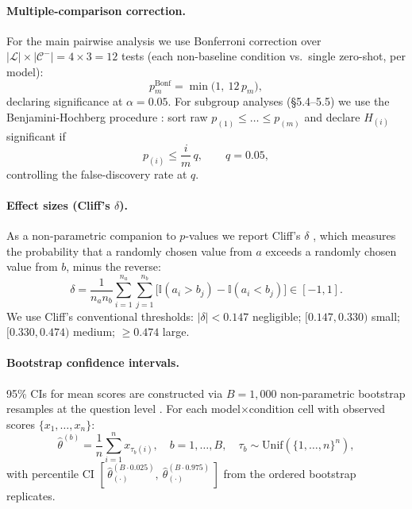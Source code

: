 \documentclass[final, 11pt, 3p]{elsarticle}
\begin{document}
\paragraph{Multiple-comparison correction.} For the main pairwise
analysis we use Bonferroni correction over $|\mathcal{L}| \times
|\mathcal{C}^{-}| = 4 \times 3 = 12$ tests (each non-baseline condition
vs.\ single zero-shot, per model):
\begin{equation}
p^{\mathrm{Bonf}}_m = \min\bigl(1,\ 12\, p_m\bigr),
\end{equation}
declaring significance at $\alpha = 0.05$. For subgroup analyses
(\S5.4--5.5) we use the Benjamini-Hochberg procedure
\cite{BenjaminiHochberg1995}: sort raw $p_{(1)} \leq \ldots \leq p_{(m)}$
and declare $H_{(i)}$ significant if
\begin{equation}
p_{(i)} \leq \frac{i}{m}\,q,\qquad q = 0.05,
\end{equation}
controlling the false-discovery rate at $q$.

\paragraph{Effect sizes (Cliff's $\delta$).} As a non-parametric
companion to $p$-values we report Cliff's $\delta$
\cite{Cliff1993}, which measures the probability that a randomly chosen
value from $a$ exceeds a randomly chosen value from $b$, minus the
reverse:
\begin{equation}
\delta = \frac{1}{n_a n_b}\sum_{i=1}^{n_a}\sum_{j=1}^{n_b}\bigl[\mathbb{I}(a_i > b_j) - \mathbb{I}(a_i < b_j)\bigr] \in [-1, 1].
\label{eq:cliff}
\end{equation}
We use Cliff's conventional thresholds: $|\delta| < 0.147$ negligible;
$[0.147, 0.330)$ small; $[0.330, 0.474)$ medium; $\geq 0.474$ large.

\paragraph{Bootstrap confidence intervals.} 95\% CIs for mean scores
are constructed via $B = 1{,}000$ non-parametric bootstrap resamples at
the question level \cite{EfronTibshirani1993}. For each model$\times$condition
cell with observed scores $\{x_1, \ldots, x_n\}$:
\begin{equation}
\hat{\theta}^{(b)} = \frac{1}{n}\sum_{i=1}^{n} x_{\tau_b(i)},\quad b = 1,\ldots,B,\quad \tau_b \sim \mathrm{Unif}(\{1,\ldots,n\}^n),
\end{equation}
with percentile CI $[\,\hat{\theta}^{(B\cdot 0.025)}_{(\cdot)},\
\hat{\theta}^{(B\cdot 0.975)}_{(\cdot)}\,]$ from the ordered bootstrap
replicates.
\end{document}
